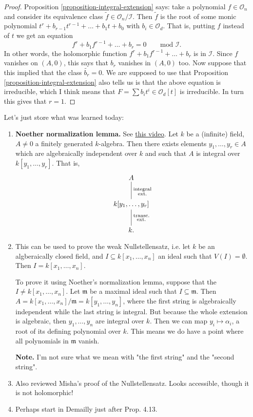 \begin{proof}
Proposition \ref{proposition-integral-extension}
says: take a polynomial $f \in \mathcal{O}_n$
and consider its equivalence class $\tilde{f}\in\mathcal{O}_n/\mathcal{I}$.
Then $\tilde{f}$ is the root of some monic polynomial 
$t^r+b_{r-1}t^{r-1}+\ldots+b_1t+b_0$
with $b_i \in \mathcal{O}_d$.
That is, putting $f$ instead of $t$ we get an equation
$$
f^r+b_1f^{r-1}+\ldots+b_r=0\qquad \text{mod }\mathcal{I}.
$$
In other words, the holomorphic function
$f^r+b_1f^{r-1}+\ldots+b_r$ is in  $\mathcal{I}$.
Since $f$ vanishes on $(A,0)$,
this says that $b_r$ vanishes in $(A,0)$ too.
Now suppose that this implied that the class $\tilde{b_r}=0$.
We are supposed to use that Proposition \ref{proposition-integral-extension}
also tells us is that the above equation is irreducible,
which I think means that $F=\sum b_it^i \in \mathcal{O}_d[t]$
is irreducible.
In turn this gives that $r=1$.
\end{proof}


\medskip\noindent
Let's just store what was learned today:
\begin{enumerate}
\item {\bf Noether normalization lemma.} 
See \href{https://www.youtube.com/watch?v=VWWoG_4XVvs}
{this video}.
Let $k$ be a (infinite) field,
$A \neq 0$ a finitely generated $k$-algebra.
Then there exists elements $y_1,\ldots,y_r \in A$ 
which are algebraically independent over $k$ 
and such that $A$ is integral over $k[y_1,\ldots,y_r]$.
That is,
$$
\xymatrix{
A\ar@{-}[d]^{\substack{\text{integral} \\ \text{ext.}}}\\
k[y_1,\ldots,y_r]\ar@{-}[d]^{\substack{\text{transc.} \\ \text{ext.}}}\\
k.
}
$$

\item This can be used to prove the weak Nullstellensatz, i.e.
let $k$ be an algberaically closed field, and $I \subseteq k[x_1,\ldots,x_n]$ 
an ideal such that $V(I)=\emptyset$. Then $I=k[x_1,\ldots,x_n]$.

To prove it using Noether's normalization lemma,
suppose that the $I\neq k[x_1,\ldots,x_n]$.
Let $\mathfrak{m}$ be a maximal ideal such that $I \subseteq \mathfrak{m}$.
Then $A=k[x_1,\ldots,x_n]/\mathfrak{m}=k[y_1,\ldots,y_n]$,
where the first string is algebraically independent
while the last string is integral. But because the 
whole extension is algebraic, then $y_1,\ldots,y_n$ 
are integral over $k$.
Then we can map $y_i \mapsto \alpha_i$, a root
of its defining polynomial over $k$.
This means we do have a point where all polynomials
in $\mathfrak{m}$ vanish.

{\bf Note.} I'm not sure what we mean with "the first string"
and the "second string".

\item Also reviewed Misha's proof of the Nullstellensatz.
Looks accessible, though it is not holomorphic!

\item Perhaps start in Demailly just after Prop. 4.13.
\end{enumerate}

